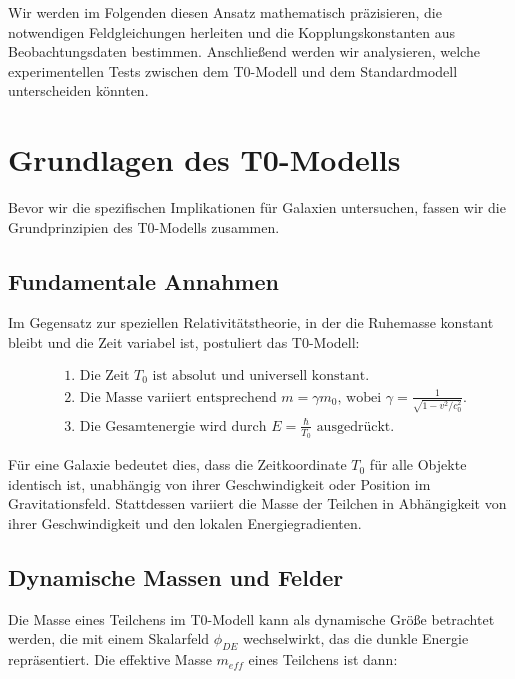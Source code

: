 \documentclass[a4paper,12pt]{article}
\begin{document}
	Wir werden im Folgenden diesen Ansatz mathematisch präzisieren, die notwendigen Feldgleichungen herleiten und die Kopplungskonstanten aus Beobachtungsdaten bestimmen. Anschließend werden wir analysieren, welche experimentellen Tests zwischen dem T0-Modell und dem Standardmodell unterscheiden könnten.
	
	\section{Grundlagen des T0-Modells}
	
	Bevor wir die spezifischen Implikationen für Galaxien untersuchen, fassen wir die Grundprinzipien des T0-Modells zusammen.
	
	\subsection{Fundamentale Annahmen}
	
	Im Gegensatz zur speziellen Relativitätstheorie, in der die Ruhemasse konstant bleibt und die Zeit variabel ist, postuliert das T0-Modell:
	
	\begin{tcolorbox}[colback=blue!5!white,colframe=blue!75!black,title=Grundannahmen des T0-Modells]
		\begin{align}
			&\text{1. Die Zeit $T_0$ ist absolut und universell konstant.} \\
			&\text{2. Die Masse variiert entsprechend $m = \gamma m_0$, wobei $\gamma = \frac{1}{\sqrt{1-v^2/c_0^2}}$.} \\
			&\text{3. Die Gesamtenergie wird durch $E = \frac{\hbar}{T_0}$ ausgedrückt.}
		\end{align}
	\end{tcolorbox}
	
	Für eine Galaxie bedeutet dies, dass die Zeitkoordinate $T_0$ für alle Objekte identisch ist, unabhängig von ihrer Geschwindigkeit oder Position im Gravitationsfeld. Stattdessen variiert die Masse der Teilchen in Abhängigkeit von ihrer Geschwindigkeit und den lokalen Energiegradienten.
	
	\subsection{Dynamische Massen und Felder}
	
	Die Masse eines Teilchens im T0-Modell kann als dynamische Größe betrachtet werden, die mit einem Skalarfeld $\phi_{DE}$ wechselwirkt, das die dunkle Energie repräsentiert. Die effektive Masse $m_{eff}$ eines Teilchens ist dann:
	
\end{document}
